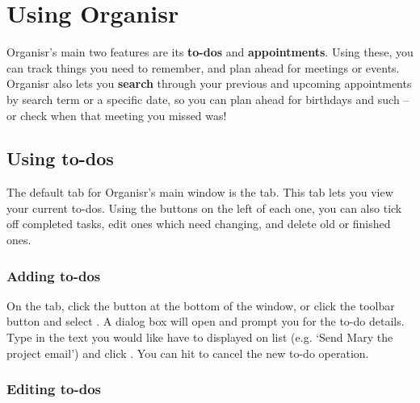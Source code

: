\section{Using Organisr}

Organisr's main two features are its \textbf{to-dos} and \textbf{appointments}.
Using these, you can track things you need to remember, and plan ahead for
meetings or events. Organisr also lets you \textbf{search} through your previous
and upcoming appointments by search term or a specific date, so you can plan
ahead for birthdays and such -- or check when that meeting you missed was!


\subsection{Using to-dos}


The default tab for Organisr's main window is the  tab. This tab
lets you view your current to-dos. Using the buttons on the left of each one,
you can also tick off completed tasks, edit ones which need changing, and delete
old or finished ones.


\subsubsection{Adding to-dos}


On the  tab, click the  button at the bottom
of the window, or click the  toolbar button and select . A dialog box will open and prompt you for the to-do details. Type
in the text you would like have to displayed on list (e.g. `Send Mary the
project email') and click . You can hit  to cancel
the new to-do operation.



\subsubsection{Editing to-dos}


